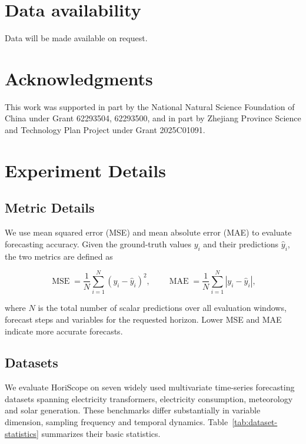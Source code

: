 \documentclass[final,3p,times]{elsarticle}
\begin{document}
\section*{Data availability}
Data will be made available on request.

\section*{Acknowledgments}
This work was supported in part by the National Natural Science Foundation of China under Grant 62293504, 62293500, and in part by Zhejiang Province Science and Technology Plan Project under Grant 2025C01091.

\appendix
\renewcommand*{\theHtable}{appendix.\Alph{section}.\arabic{table}}
\renewcommand*{\theHfigure}{appendix.\Alph{section}.\arabic{figure}}

\setcounter{table}{0}
\setcounter{figure}{0}
\section{Experiment Details}
\label{app:experiment-details}


\subsection{Metric Details}


We use mean squared error (MSE) and mean absolute error (MAE) to evaluate forecasting accuracy. Given the ground-truth values $y_i$ and their predictions $\widehat y_i$, the two metrics are defined as

\[
\operatorname{MSE}
=
\frac{1}{N}
\sum_{i=1}^{N}
\left(y_i-\widehat y_i\right)^2,
\qquad
\operatorname{MAE}
=
\frac{1}{N}
\sum_{i=1}^{N}
\left|y_i-\widehat y_i\right|,
\]


where $N$ is the total number of scalar predictions over all evaluation windows, forecast steps and variables for the requested horizon. Lower MSE and MAE indicate more accurate forecasts.

\subsection{Datasets}


We evaluate HoriScope on seven widely used multivariate time-series forecasting datasets spanning electricity transformers, electricity consumption, meteorology and solar generation. These benchmarks differ substantially in variable dimension, sampling frequency and temporal dynamics. Table~\ref{tab:dataset-statistics} summarizes their basic statistics.
\end{document}
